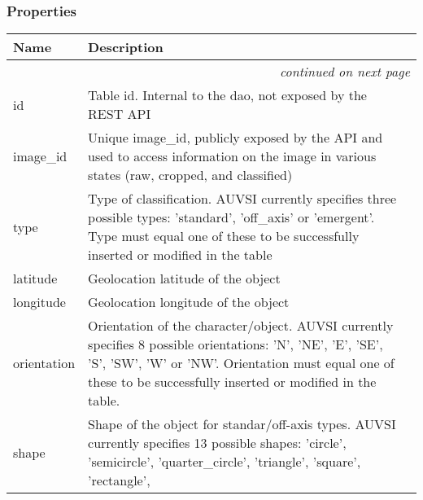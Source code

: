 
  \subsubsection{Properties}

    \vspace{-1cm}
\hspace{\varindent}\begin{longtable}{|p{\varnamewidth}|p{\vardescrwidth}|l}
\cline{1-2}
\cline{1-2} \centering \textbf{Name} & \centering \textbf{Description}& \\
\cline{1-2}
\endhead\cline{1-2}\multicolumn{3}{r}{\small\textit{continued on next page}}\\\endfoot\cline{1-2}
\endlastfoot\raggedright i\-d\- & \raggedright Table id. Internal to the dao, not exposed by the REST API&\\
\cline{1-2}
\raggedright i\-m\-a\-g\-e\-\_\-i\-d\- & \raggedright Unique image\_id, publicly exposed by the API and used to access 
          information on the image in various states (raw, cropped, and 
          classified)&\\
\cline{1-2}
\raggedright t\-y\-p\-e\- & \raggedright Type of classification. AUVSI currently specifies three possible 
          types: 'standard', 'off\_axis' or 'emergent'. Type must equal one
          of these to be successfully inserted or modified in the table&\\
\cline{1-2}
\raggedright l\-a\-t\-i\-t\-u\-d\-e\- & \raggedright Geolocation latitude of the object&\\
\cline{1-2}
\raggedright l\-o\-n\-g\-i\-t\-u\-d\-e\- & \raggedright Geolocation longitude of the object&\\
\cline{1-2}
\raggedright o\-r\-i\-e\-n\-t\-a\-t\-i\-o\-n\- & \raggedright Orientation of the character/object. AUVSI currently specifies 8 
          possible orientations: 'N', 'NE', 'E', 'SE', 'S', 'SW', 'W' or 
          'NW'. Orientation must equal one of these to be successfully 
          inserted or modified in the table.&\\
\cline{1-2}
\raggedright s\-h\-a\-p\-e\- & \raggedright Shape of the object for standar/off-axis types. AUVSI currently 
          specifies 13 possible shapes: 'circle', 'semicircle', 
          'quarter\_circle', 'triangle', 'square', 'rectangle', 

\end{longtable}
